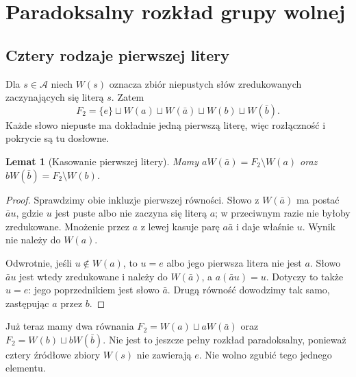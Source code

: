 \documentclass[11pt,a4paper]{article}
\numberwithin{equation}{section}
\theoremstyle{plain}
\newtheorem{lemat}[twierdzenie]{Lemat}
\theoremstyle{definition}
\theoremstyle{remark}
\begin{document}
\section{Paradoksalny rozkład grupy wolnej}
\subsection{Cztery rodzaje pierwszej litery}
Dla $s\in\mathcal A$ niech $W(s)$ oznacza zbiór niepustych słów zredukowanych zaczynających się literą $s$. Zatem
\begin{equation}\label{eq:4-1}
 F_2=\{e\}\sqcup W(a)\sqcup W(\bar a)\sqcup W(b)\sqcup W(\bar b).
\end{equation}
Każde słowo niepuste ma dokładnie jedną pierwszą literę, więc rozłączność i pokrycie są tu dosłowne.
\begin{lemat}[Kasowanie pierwszej litery]\label{lem:pierwsza-litera}
Mamy $aW(\bar a)=F_2\setminus W(a)$ oraz $bW(\bar b)=F_2\setminus W(b)$.
\end{lemat}
\begin{proof}
Sprawdzimy obie inkluzje pierwszej równości. Słowo z $W(\bar a)$ ma postać $\bar au$, gdzie $u$ jest puste albo nie zaczyna się literą $a$; w przeciwnym razie nie byłoby zredukowane. Mnożenie przez $a$ z lewej kasuje parę $a\bar a$ i daje właśnie $u$. Wynik nie należy do $W(a)$.

Odwrotnie, jeśli $u\notin W(a)$, to $u=e$ albo jego pierwsza litera nie jest $a$. Słowo $\bar au$ jest wtedy zredukowane i należy do $W(\bar a)$, a $a(\bar au)=u$. Dotyczy to także $u=e$: jego poprzednikiem jest słowo $\bar a$. Drugą równość dowodzimy tak samo, zastępując $a$ przez $b$.
\end{proof}
Już teraz mamy dwa równania $F_2=W(a)\sqcup aW(\bar a)$ oraz $F_2=W(b)\sqcup bW(\bar b)$. Nie jest to jeszcze pełny rozkład paradoksalny, ponieważ cztery źródłowe zbiory $W(s)$ nie zawierają $e$. Nie wolno zgubić tego jednego elementu.
\end{document}
